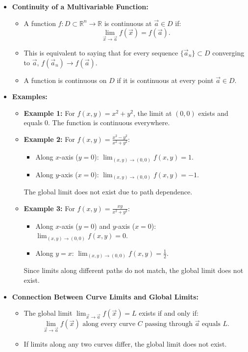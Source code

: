 \documentclass{article}
\begin{document}
\begin{itemize}
  \item \textbf{Continuity of a Multivariable Function:}
    \begin{itemize}
      \item A function $f: D \subset \mathbb{R}^n \to \mathbb{R}$ is continuous at $\vec{a} \in D$ if:
        \[
          \lim_{\vec{x} \to \vec{a}} f(\vec{x}) = f(\vec{a}).
        \]
      \item This is equivalent to saying that for every sequence $\{\vec{a}_n\} \subset D$ converging to $\vec{a}$, $f(\vec{a}_n) \to f(\vec{a})$.
      \item A function is continuous on $D$ if it is continuous at every point $\vec{a} \in D$.
    \end{itemize}

  \item \textbf{Examples:}
    \begin{itemize}
      \item \textbf{Example 1:} For $f(x, y) = x^2 + y^2$, the limit at $(0, 0)$ exists and equals $0$. The function is continuous everywhere.
      \item \textbf{Example 2:} For $f(x, y) = \frac{x^2 - y^2}{x^2 + y^2}$:
        \begin{itemize}
          \item Along $x$-axis ($y = 0$): $\lim_{(x, y) \to (0, 0)} f(x, y) = 1$.
          \item Along $y$-axis ($x = 0$): $\lim_{(x, y) \to (0, 0)} f(x, y) = -1$.
        \end{itemize}
        The global limit does not exist due to path dependence.
      \item \textbf{Example 3:} For $f(x, y) = \frac{xy}{x^2 + y^2}$:
        \begin{itemize}
          \item Along $x$-axis ($y = 0$) and $y$-axis ($x = 0$): $\lim_{(x, y) \to (0, 0)} f(x, y) = 0$.
          \item Along $y = x$: $\lim_{(x, y) \to (0, 0)} f(x, y) = \frac{1}{2}$.
        \end{itemize}
        Since limits along different paths do not match, the global limit does not exist.
    \end{itemize}

  \item \textbf{Connection Between Curve Limits and Global Limits:}
    \begin{itemize}
      \item The global limit $\lim_{\vec{x} \to \vec{a}} f(\vec{x}) = L$ exists if and only if:
        \[
          \lim_{\vec{x} \to \vec{a}} f(\vec{x}) \text{ along every curve } C \text{ passing through } \vec{a} \text{ equals } L.
        \]
      \item If limits along any two curves differ, the global limit does not exist.
    \end{itemize}
\end{itemize}
\end{document}
